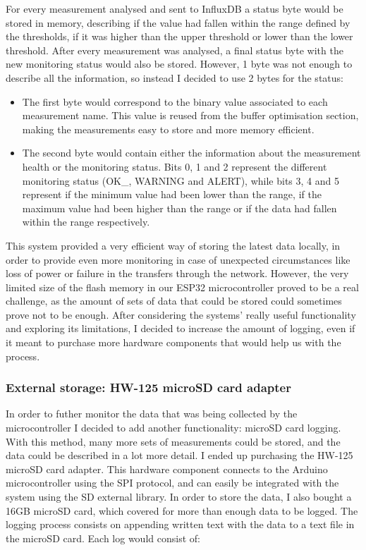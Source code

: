 \documentclass[12pt]{article}
\begin{document}
For every measurement analysed and sent to InfluxDB a status byte would be stored in memory, describing if the value had fallen within the range defined by the thresholds, if it was higher than the upper threshold or lower than the lower threshold. After every measurement was analysed, a final status byte with the new monitoring status would also be stored. However, 1 byte was not enough to describe all the information, so instead I decided to use 2 bytes for the status:
\begin{itemize}
    \item The first byte would correspond to the binary value associated to each measurement name. This value is reused from the buffer optimisation section, making the measurements easy to store and more memory efficient.
    \item The second byte would contain either the information about the measurement health or the monitoring status. Bits 0, 1 and 2 represent the different monitoring status (OK\_, WARNING and ALERT), while bits 3, 4 and 5 represent if the minimum value had been lower than the range, if the maximum value had been higher than the range or if the data had fallen within the range respectively. 
\end{itemize}

This system provided a very efficient way of storing the latest data locally, in order to provide even more monitoring in case of unexpected circumstances like loss of power or failure in the transfers through the network. However, the very limited size of the flash memory in our ESP32 microcontroller proved to be a real challenge, as the amount of sets of data that could be stored could sometimes prove not to be enough. After considering the systems' really useful functionality and exploring its limitations, I decided to increase the amount of logging, even if it meant to purchase more hardware components that would help us with the process. 

\subsubsection{External storage: HW-125 microSD card adapter}

In order to futher monitor the data that was being collected by the microcontroller I decided to add another functionality: microSD card logging. With this method, many more sets of measurements could be stored, and the data could be described in a lot more detail. I ended up purchasing the HW-125 microSD card adapter. This hardware component connects to the Arduino microcontroller using the SPI protocol, and can easily be integrated with the system using the SD external library. In order to store the data, I also bought a 16GB microSD card, which covered for more than enough data to be logged. The logging process consists on appending written text with the data to a text file in the microSD card. Each log would consist of:
\end{document}
